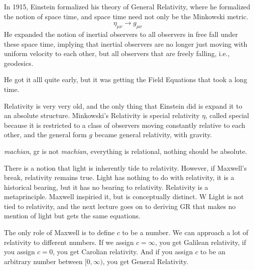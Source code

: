 		In 1915, Einstein formalized his theory of General Relativity, where he formalized
		the notion of space time, and space time need not only be the Minkowski metric.
		\begin{equation}
			\eta_{\mu\nu}\to	g_{\mu\nu}
		\end{equation}
		He expanded the notion of inertial observers to all observers in free fall
		under these space time, implying that inertial observers are no longer just
		moving with uniform velocity to each other, but all observers that are freely
		falling, i.e., geodesics.

		He got it alll quite early, but it was getting the Field Equations that took
		a long time.

		Relativity is very very old, and the only thing that Einstein did is expand it to an absolute structure.
		Minkowski's Relativity is special relativity $\eta$, called special because it is
		restricted to a class of observers moving constantly relative to each other,
		and the general form $g$ became general relativity, with gravity.

		\textit{machian}, gr is not \textit{machian}, everything is relational, nothing should be absolute.

		There is a notion that light is inherently tide to relativity. However, if Maxwell's break, relativity
		remains true. Light has nothing to do with relativity, it is a historical bearing, but it has no bearing to relativity. Relativity is a metaprinciple. Maxwell inspiried it, but is conceptually distinct. W
		Light is not tied to relativity, and the next lecture goes on to deriving GR that makes no mention
		of light but gets the same equations.

		The only role of Maxwell is to define $c$ to be a number.
		We can approach a lot of relativity to different numbers. If we assign $c= \infty$, you get Galilean relativity,
		if you assign $c=0$, you get
		Carolian relativity. And if you assign $c$ to be an arbitrary number between $[0,\infty)$, you get General Relativity.
